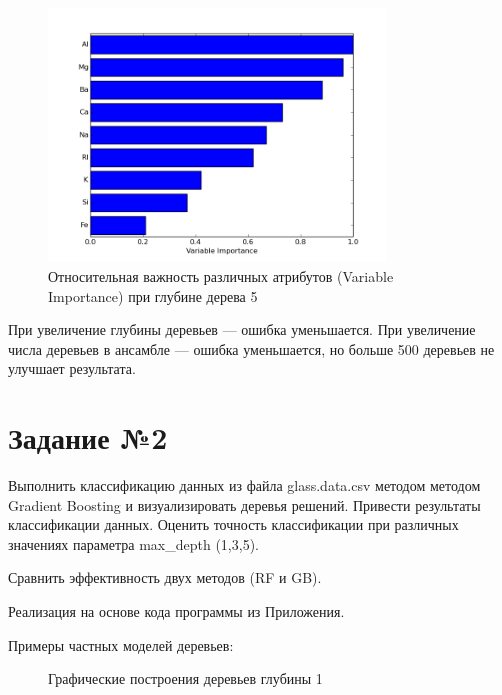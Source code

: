 \documentclass{article} %
\begin{document}
\begin{figure}[H]
    \centering
    \includegraphics[width=0.8\textwidth]{varImp5depth}
    \caption{Относительная важность различных атрибутов
    (Variable Importance) при глубине дерева 5}
\end{figure}

При увеличение глубины деревьев ---
ошибка уменьшается.
При увеличение числа деревьев в ансамбле ---
ошибка уменьшается, но больше 500 деревьев
не улучшает результата.

\clearpage
\section{Задание №2}
Выполнить классификацию данных из файла glass.data.csv
методом методом Gradient Boosting и визуализировать деревья решений.
Привести результаты классификации данных.
Оценить точность классификации при различных значениях параметра
max\_depth (1,3,5).

Сравнить эффективность двух методов (RF и GB).
\bigskip

Реализация на основе кода программы из Приложения.
\bigskip

Примеры частных моделей деревьев:
\begin{figure}[H]
	\centering
	\hfill
    \caption{Графические построения деревьев глубины 1}
\end{figure}
\bigskip
\end{document}
